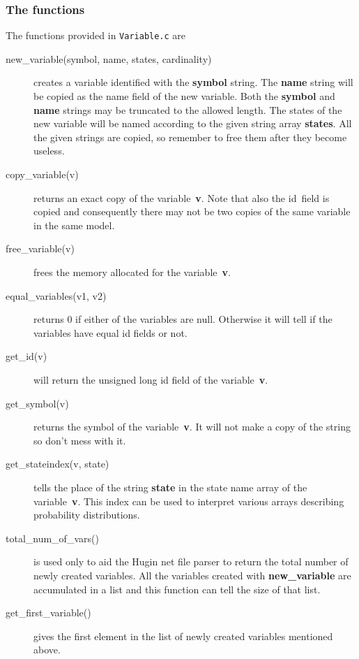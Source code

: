 \documentclass[12pt,a4paper]{report}
\begin{document}
\subsubsection{The functions}
The functions provided in \verb+Variable.c+ are
\begin{description}
\item[new\_variable(symbol, name, states, cardinality)] creates a
variable identified with the \textbf{symbol} string. The \textbf{name} 
string will be copied as the name field of the new variable. Both the 
\textbf{symbol} and \textbf{name} strings may be truncated to the 
allowed length. The states of the new variable will be named according 
to the given string array \textbf{states}. All the given strings are 
copied, so remember to free them after they become useless.

\item[copy\_variable(v)] returns an exact copy of the
variable~\textbf{v}. Note that also the id~field is copied and 
consequently there may not be two copies of the same variable in the 
same model.

\item[free\_variable(v)] frees the memory allocated for the
variable~\textbf{v}. 

\item[equal\_variables(v1, v2)] returns 0 if either of the variables
are null. Otherwise it will tell if the variables have equal id fields
or not.

\item[get\_id(v)] will return the unsigned long id field of the 
variable~\textbf{v}.

\item[get\_symbol(v)] returns the symbol of the variable~\textbf{v}. It
will not make a copy of the string so don't mess with it.

\item[get\_stateindex(v, state)] tells the place of the string
\textbf{state} in the state name array of the
variable~\textbf{v}. This index can be used to interpret various
arrays describing probability distributions. 

\item[total\_num\_of\_vars()] is used only to aid the Hugin net file
parser to return the total number of newly created variables. All 
the variables created with \textbf{new\_variable} are accumulated 
in a list and this function can tell the size of that list.

\item[get\_first\_variable()] gives the first element in the list
of newly created variables mentioned above.


\end{description}
\end{document}
